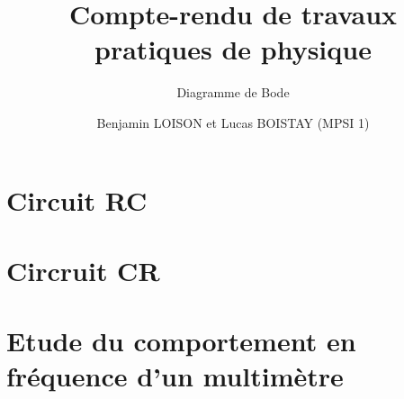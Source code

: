 \documentclass{scrartcl}
\begin{document}
	\title{\vspace{-2cm}Compte-rendu de travaux pratiques de physique}
	\subtitle{Diagramme de Bode}
	\author{Benjamin LOISON et Lucas BOISTAY (MPSI 1)}
	\date{}
	\maketitle

	\section{Circuit RC}

		

	\section{Circruit CR}
	
		
	
	\section{Etude du comportement en fréquence d'un multimètre}
		
		
			
\end{document}
